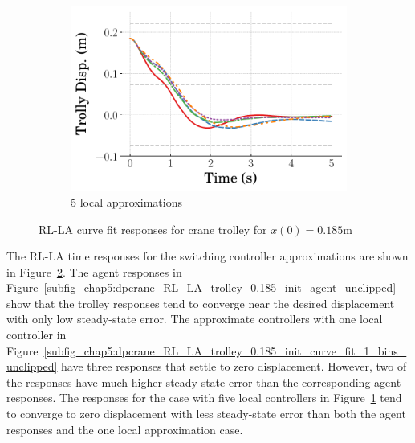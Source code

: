 \begin{figure}
    \hfill
    \begin{subfigure}[b]{0.32\textwidth}
        \centering
        \includegraphics[width=\textwidth]{figures/figures_Interpretability/Mean_ISE_dpcrane_cubic_5_bins/curve_fit_time_responses/RL_LA/curve_fit_0p18_Trolly_Disp.pdf} 
        \caption{5 local approximations}
        \label{subfig_chap5:dpcrane_RL_LA_trolley_0.185_init_curve_fit_5_bins_unclipped}
    \end{subfigure}
    \hfill
    \caption{RL-LA curve fit responses for crane trolley for $x(0)=0.185\si{\meter}$}
    \label{fig_chap5:dpcrane_RL_LA_trolley_0.185_init_unclipped}
\end{figure}
%
The RL-LA time responses for the switching controller approximations are shown in Figure~\ref{fig_chap5:dpcrane_RL_LA_trolley_0.185_init_unclipped}. The agent responses in Figure~\ref{subfig_chap5:dpcrane_RL_LA_trolley_0.185_init_agent_unclipped} show that the trolley responses tend to converge near the desired displacement with only low steady-state error. The approximate controllers with one local controller in Figure~\ref{subfig_chap5:dpcrane_RL_LA_trolley_0.185_init_curve_fit_1_bins_unclipped} have three responses that settle to zero displacement. However, two of the responses have much higher steady-state error than the corresponding agent responses. The responses for the case with five local controllers in Figure~\ref{subfig_chap5:dpcrane_RL_LA_trolley_0.185_init_curve_fit_5_bins_unclipped} tend to converge to zero displacement with less steady-state error than both the agent responses and the one local approximation case.

